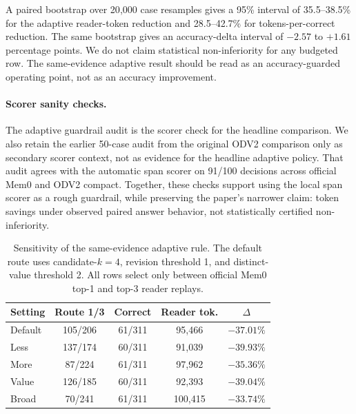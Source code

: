 \documentclass{article}
\begin{document}
A paired bootstrap over 20{,}000 case resamples gives a 95\% interval of 35.5--38.5\% for the adaptive reader-token reduction and 28.5--42.7\% for tokens-per-correct reduction. The same bootstrap gives an accuracy-delta interval of $-2.57$ to $+1.61$ percentage points. We do not claim statistical non-inferiority for any budgeted row. The same-evidence adaptive result should be read as an accuracy-guarded operating point, not as an accuracy improvement.

\paragraph{Scorer sanity checks.}
The adaptive guardrail audit is the scorer check for the headline comparison. We also retain the earlier 50-case audit from the original ODV2 comparison only as secondary scorer context, not as evidence for the headline adaptive policy. That audit agrees with the automatic span scorer on 91/100 decisions across official Mem0 and ODV2 compact. Together, these checks support using the local span scorer as a rough guardrail, while preserving the paper's narrower claim: token savings under observed paired answer behavior, not statistically certified non-inferiority.

\begin{table}[t]
\caption{Sensitivity of the same-evidence adaptive rule. The default route uses candidate-$k=4$, revision threshold 1, and distinct-value threshold 2. All rows select only between official Mem0 top-1 and top-3 reader replays.}
\label{tab:adaptive_sensitivity}
\vskip 0.1in
\begin{center}
\begin{tiny}
\begin{tabular}{@{}lcccc@{}}
\toprule
Setting & Route 1/3 & Correct & Reader tok. & $\Delta$ \\
\midrule
Default & 105/206 & 61/311 & 95{,}466 & $-37.01\%$ \\
\midrule
Less & 137/174 & 60/311 & 91{,}039 & $-39.93\%$ \\
\midrule
More & 87/224 & 61/311 & 97{,}962 & $-35.36\%$ \\
\midrule
Value & 126/185 & 60/311 & 92{,}393 & $-39.04\%$ \\
\midrule
Broad & 70/241 & 61/311 & 100{,}415 & $-33.74\%$ \\
\bottomrule
\end{tabular}
\end{tiny}
\end{center}
\vskip -0.1in
\end{table}
\end{document}
